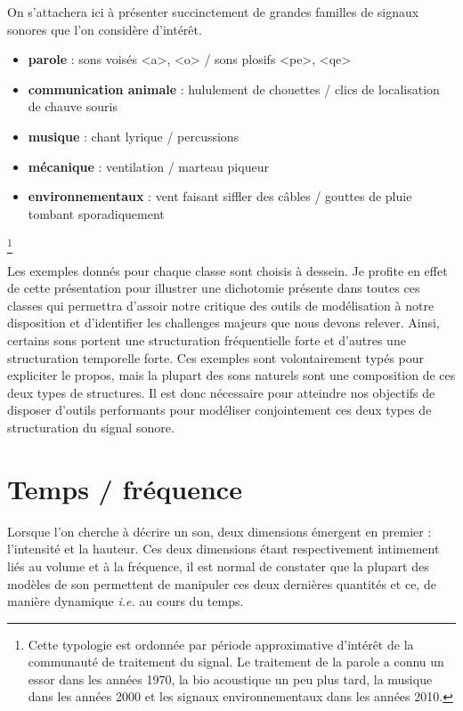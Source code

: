 On s'attachera ici à présenter succinctement de grandes familles de signaux sonores que l'on considère d'intérêt.

\begin{itemize}
  \item \textbf{parole} : sons voisés <a>, <o> / sons plosifs <pe>, <qe>
  \item \textbf{communication animale} : hululement de chouettes / clics de localisation de chauve souris
  \item \textbf{musique} : chant lyrique / percussions
  \item \textbf{mécanique} : ventilation / marteau piqueur
  \item \textbf{environnementaux} : vent faisant siffler des câbles / gouttes de pluie tombant sporadiquement
\end{itemize}\footnote{Cette typologie est ordonnée par période approximative d'intérêt de la communauté de traitement du signal. Le traitement de la parole a connu un essor dans les années 1970, la bio acoustique un peu plus tard, la musique dans les années 2000 et les signaux environnementaux dans les années 2010.}

Les exemples donnés pour chaque classe sont choisis à dessein. Je profite en effet de cette présentation pour illustrer une dichotomie présente dans toutes ces classes qui permettra d'assoir notre critique des outils de modélisation à notre disposition et d'identifier les challenges majeurs que nous devons relever. Ainsi, certains sons portent une structuration fréquentielle forte et d'autres une structuration temporelle forte. Ces exemples sont volontairement typés pour expliciter le propos, mais la plupart des sons naturels sont une composition de ces deux types de structures. Il est donc nécessaire pour atteindre nos objectifs de disposer d'outils performants pour modéliser conjointement ces deux types de structuration du signal sonore.

\section{ \nmu Temps / fréquence} \label{sec:tf}

Lorsque l'on cherche à décrire un son, deux dimensions émergent en premier : l'intensité et la hauteur. Ces deux dimensions étant respectivement intimement liés au volume et à la fréquence, il est normal de constater que la plupart des modèles de son permettent de manipuler ces deux dernières quantités et ce, de manière dynamique \textit{i.e.} au cours du temps.

